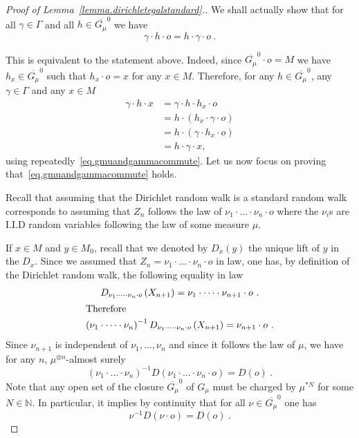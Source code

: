 \documentclass[AHL,Unicode,longabstracts,published]{cedram}
\newcommand{\NN}{\mathbb{N}}
\begin{document}
\begin{proof}[Proof of Lemma~\ref{lemma.dirichletegalstandard}.] We shall actually show that for all $\gamma \in \Gamma$ and all $h \in \overline{G_{\mu}}^0$ we have
\begin{equation}\label{eq.gmuandgammacommute}
\gamma \cdot h \cdot o = h \cdot \gamma \cdot o \ .
\end{equation}

This is equivalent to the statement above. Indeed, since $\overline{G_{\mu}}^0 \cdot o = M$ we have $h_x \in \overline{G_{\mu}}^0$ such that $h_x \cdot o = x$ for any $x \in M$. Therefore, for any $h \in \overline{G_{\mu}}^0$, any $\gamma \in \Gamma$ and any $x \in M$
\begin{align*}
\gamma \cdot h \cdot x &= \gamma \cdot h \cdot h_x \cdot o \\
&= h \cdot \left(h_x \cdot \gamma \cdot o\right) \\
&= h \cdot \left(\gamma \cdot h_x \cdot o\right) \\
&= h \cdot \gamma \cdot x,
\end{align*}
using repeatedly~\eqref{eq.gmuandgammacommute}. Let us now focus on proving that~\eqref{eq.gmuandgammacommute} holds.

Recall that assuming that the Dirichlet random walk is a standard random walk corresponds to assuming that $Z_n$ follows the law of $\nu_1 \cdot\dots \cdot \nu_n \cdot o$ where the $\nu_i$s are I.I.D random variables following the law of some measure $\mu$.

If $x \in M$ and $y \in M_0$, recall that we denoted by $D_{x}(y)$ the unique lift of $y$ in the $D_x$. Since we assumed that $Z_n = \nu_1 \cdot\dots \cdot \nu_n \cdot o$ in law, one has, by definition of the Dirichlet random walk, the following equality in law
\begin{gather*}
D_{\nu_1 \cdot\dots \cdot \nu_n \cdot o}\left(X_{n+1}\right) = \nu_1 \cdot\dots \cdot \nu_{n+1} \cdot o \ .
\\
\intertext{Therefore}
\left(\nu_1 \cdot\dots \cdot \nu_{n}\right)^{-1} D_{\nu_1 \cdot\dots \cdot \nu_n \cdot o}\left(X_{n+1}\right) = \nu_{n+1} \cdot o \ .
\end{gather*}
Since $\nu_{n+1}$ is independent of $\nu_1,\dots, \nu_{n}$ and since it follows the law of $\mu$, we have for any $n$, $\mu^{\otimes n}$-almost surely
\[
\left(\nu_1 \cdot\dots \cdot \nu_{n}\right)^{-1} D\left(\nu_1 \cdot\dots \cdot \nu_n \cdot o\right) = D(o) \ .
\]
Note that any open set of the closure $\overline{G_{\mu}}^0$ of $G_{\mu}$ must be charged by $\mu^{*N}$ for some $N \in \NN$. In particular, it implies by continuity that for all $\nu \in \overline{G_{\mu}}^0$ one has
\begin{equation}\label{eq.dirichletstandard2}
\nu^{-1} D(\nu \cdot o) = D(o) \ .
\end{equation}


\end{proof}
\end{document}
